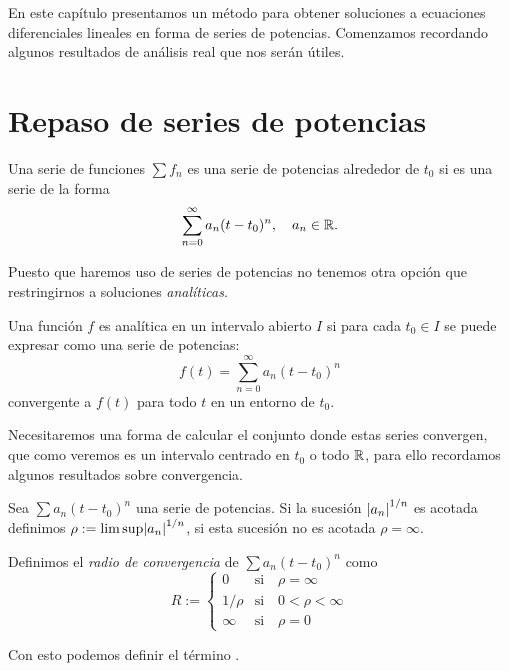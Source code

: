 \documentclass[../ecuaciones_diferenciales.tex]{subfiles}
\begin{document}
En este capítulo presentamos un método para obtener soluciones a ecuaciones
diferenciales lineales en forma de series de potencias. Comenzamos recordando
algunos resultados de análisis real que nos serán útiles.

\section{Repaso de series de potencias}

\begin{definition}
	Una serie de funciones \(\sum f_n\) es una serie de potencias alrededor de
	\(t_0\) si es una serie de la forma
	\[\sum_{n = 0}^\infty a_n (t - t_0)^n, \quad a_n \in \mathbb{R}.\]
\end{definition}

Puesto que haremos uso de series de potencias no tenemos otra opción 
que restringirnos a soluciones \emph{analíticas}.

\begin{definition}
	Una función \(f\) es analítica en un intervalo abierto \(I\) si para cada
	\(t_0 \in I\) se puede expresar como una serie de potencias:
	\[f(t) = \sum_{n = 0}^\infty a_n (t - t_0)^n\]
	convergente a \(f(t)\) para todo \(t\) en un entorno de \(t_0\).
\end{definition}

Necesitaremos una forma de calcular el conjunto donde estas series convergen,
que como veremos es un intervalo centrado en \(t_0\) o todo \(\mathbb{R}\), para ello 
recordamos algunos resultados sobre convergencia.

\begin{definition}
	Sea \(\sum a_n (t - t_0)^n\) una serie de potencias. Si la sucesión 
	\(\abs{a_n}^{1/n}\) es acotada definimos 
	\(\rho := \lim\sup\abs{a_n}^{1/n}\), si esta sucesión no es acotada 
	\(\rho = \infty\). 

	Definimos el \emph{radio de convergencia} de \(\sum a_n (t - t_0)^n\) como
	\[R := 
		\begin{cases}
			0 & \text{si} \quad \rho = \infty \\
			1/\rho & \text{si} \quad 0 < \rho < \infty \\
			\infty & \text{si} \quad \rho = 0
		\end{cases}
	\]
\end{definition}

Con esto podemos definir el término .
\end{document}
